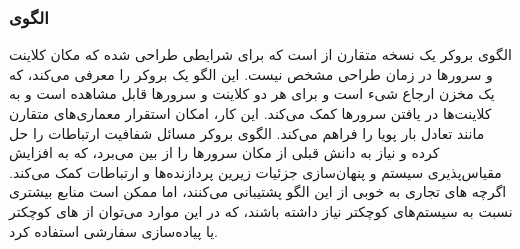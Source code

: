 \subsubsection{الگوی }
\label{distrBrokerSec}
\begin{RTL}
الگوی بروکر \cite{ref4}
یک نسخه متقارن از  است که برای شرایطی
طراحی شده که مکان کلاینت و سرورها در زمان طراحی مشخص نیست. این الگو
یک بروکر را معرفی می‌کند، که یک مخزن ارجاع شیء است
و برای هر دو کلاینت و سرورها قابل مشاهده است و
به کلاینت‌ها در یافتن سرورها کمک می‌کند. این کار، امکان استقرار
معماری‌های متقارن مانند تعادل بار پویا را فراهم می‌کند. الگوی بروکر
مسائل شفافیت ارتباطات را حل کرده و نیاز به دانش قبلی از مکان سرورها
را از بین می‌برد، که به افزایش مقیاس‌پذیری سیستم و پنهان‌سازی جزئیات زیرین
پردازنده‌ها و ارتباطات کمک می‌کند. اگرچه های
تجاری به خوبی از این الگو پشتیبانی می‌کنند، اما ممکن است منابع بیشتری
نسبت به سیستم‌های کوچکتر نیاز داشته باشند، که در این
موارد می‌توان از های کوچکتر یا پیاده‌سازی سفارشی استفاده کرد.
\end{RTL}